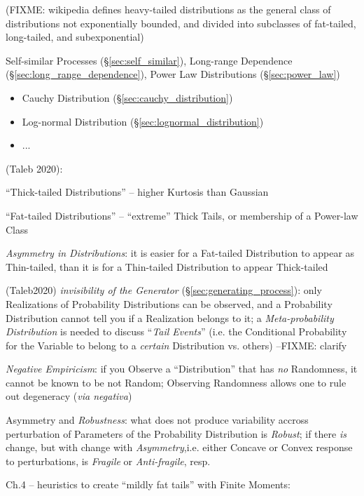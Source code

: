 (FIXME: wikipedia defines heavy-tailed distributions as the general class of
distributions not exponentially bounded, and divided into subclasses of
fat-tailed, long-tailed, and subexponential)

\fist Self-similar Processes (\S\ref{sec:self_similar}), Long-range Dependence
(\S\ref{sec:long_range_dependence}), Power Law Distributions
(\S\ref{sec:power_law})

\begin{itemize}
  \item Cauchy Distribution (\S\ref{sec:cauchy_distribution})
  \item Log-normal Distribution (\S\ref{sec:lognormal_distribution})
  \item ...
\end{itemize}

(Taleb 2020):

``Thick-tailed Distributions'' -- higher Kurtosis than Gaussian

``Fat-tailed Distributions'' -- ``extreme'' Thick Tails, or membership of a
Power-law Class

\emph{Asymmetry in Distributions}: it is easier for a Fat-tailed Distribution to
appear as Thin-tailed, than it is for a Thin-tailed Distribution to appear
Thick-tailed

(Taleb2020) \emph{invisibility of the Generator}
(\S\ref{sec:generating_process}): only Realizations of Probability Distributions
can be observed, and a Probability Distribution cannot tell you if a Realization
belongs to it; a \emph{Meta-probability Distribution} is needed to discuss
``\emph{Tail Events}'' (i.e. the Conditional Probability for the Variable to
belong to a \emph{certain} Distribution vs. others) --FIXME: clarify

\emph{Negative Empiricism}: if you Observe a ``Distribution'' that has \emph{no}
Randomness, it cannot be known to be not Random; Observing Randomness allows one
to rule out degeneracy (\emph{via negativa})

Asymmetry and \emph{Robustness}: what does not produce variability accross
perturbation of Parameters of the Probability Distribution is \emph{Robust}; if
there \emph{is} change, but with change with \emph{Asymmetry},i.e. either
Concave or Convex response to perturbations, is \emph{Fragile} or
\emph{Anti-fragile}, resp.

Ch.4 -- heuristics to create ``mildly fat tails'' with Finite Moments:

